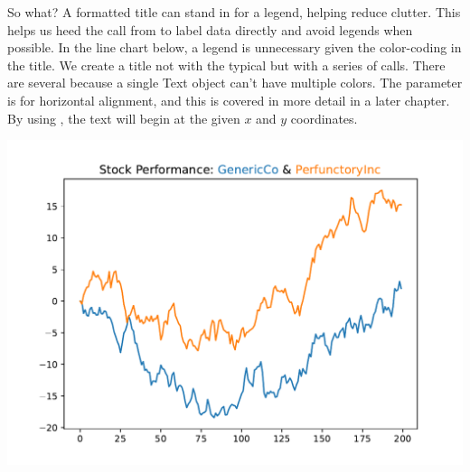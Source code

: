 So what? A formatted title can stand in for a legend, helping reduce clutter. This helps us heed the call from \cite{schwabish2021better} to label data directly and avoid legends when possible. In the line chart below, a legend is unnecessary given the color-coding in the title. We create a title not with the typical  but with a series of  calls. There are several because a single Text object can't have multiple colors. The  parameter is for horizontal alignment, and this is covered in more detail in a later chapter. By using , the text will begin at the given $x$ and $y$ coordinates. %


\begin{center}
    \includegraphics[width = .7\textwidth]{figures/proseplots/multicolor-title.pdf}
\end{center}


